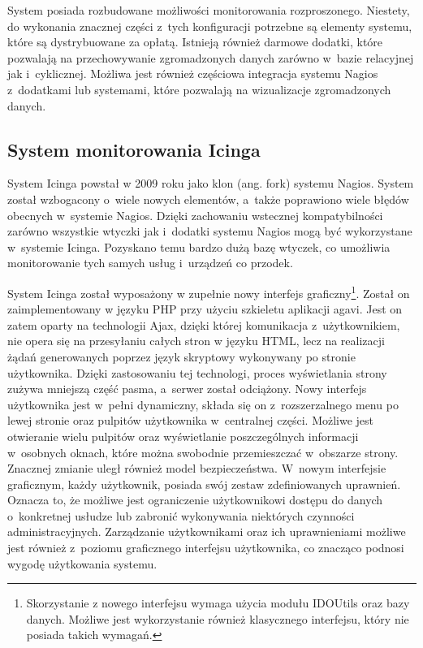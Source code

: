 System posiada rozbudowane możliwości monitorowania
rozproszonego. Niestety, do wykonania znacznej części z~tych
konfiguracji potrzebne są elementy systemu, które są dystrybuowane za
opłatą. Istnieją również darmowe dodatki, które pozwalają na
przechowywanie zgromadzonych danych zarówno w~bazie relacyjnej jak
i~cyklicznej. Możliwa jest również częściowa integracja systemu Nagios
z~dodatkami lub systemami, które pozwalają na wizualizacje
zgromadzonych danych.

\subsection[Icinga][System monitorowania Icinga]{System monitorowania Icinga}
\label{subsec:Icinga}

System Icinga powstał w 2009 roku jako klon (ang. fork) systemu
Nagios. System został wzbogacony o~wiele nowych elementów, a~także
poprawiono wiele błędów obecnych w~systemie Nagios. Dzięki zachowaniu
wstecznej kompatybilności zarówno wszystkie wtyczki jak i~dodatki
systemu Nagios mogą być wykorzystane w~systemie Icinga. Pozyskano temu
bardzo dużą bazę wtyczek, co umożliwia monitorowanie tych samych usług
i~urządzeń co przodek.

System Icinga został wyposażony w zupełnie nowy interfejs
graficzny\footnote{Skorzystanie z nowego interfejsu wymaga użycia
  modułu IDOUtils oraz bazy danych. Możliwe jest wykorzystanie również
  klasycznego interfejsu, który nie posiada takich wymagań.}. Został
on zaimplementowany w języku PHP przy użyciu szkieletu aplikacji
agavi. Jest on zatem oparty na technologii Ajax, dzięki której
komunikacja z~użytkownikiem, nie opera się na przesyłaniu całych stron
w języku HTML, lecz na realizacji żądań generowanych poprzez język
skryptowy wykonywany po stronie użytkownika. Dzięki zastosowaniu tej
technologi, proces wyświetlania strony zużywa mniejszą część pasma,
a~serwer został odciążony. Nowy interfejs użytkownika jest w~pełni
dynamiczny, składa się on z~rozszerzalnego menu po lewej stronie oraz
pulpitów użytkownika w~centralnej części. Możliwe jest otwieranie
wielu pulpitów oraz wyświetlanie poszczególnych informacji w~osobnych
oknach, które można swobodnie przemieszczać w~obszarze
strony. Znacznej zmianie uległ również model bezpieczeństwa. W~nowym
interfejsie graficznym, każdy użytkownik, posiada swój zestaw
zdefiniowanych uprawnień. Oznacza to, że możliwe jest ograniczenie
użytkownikowi dostępu do danych o~konkretnej usłudze lub zabronić
wykonywania niektórych czynności administracyjnych. Zarządzanie
użytkownikami oraz ich uprawnieniami możliwe jest również z~poziomu
graficznego interfejsu użytkownika, co znacząco podnosi wygodę
użytkowania systemu.

